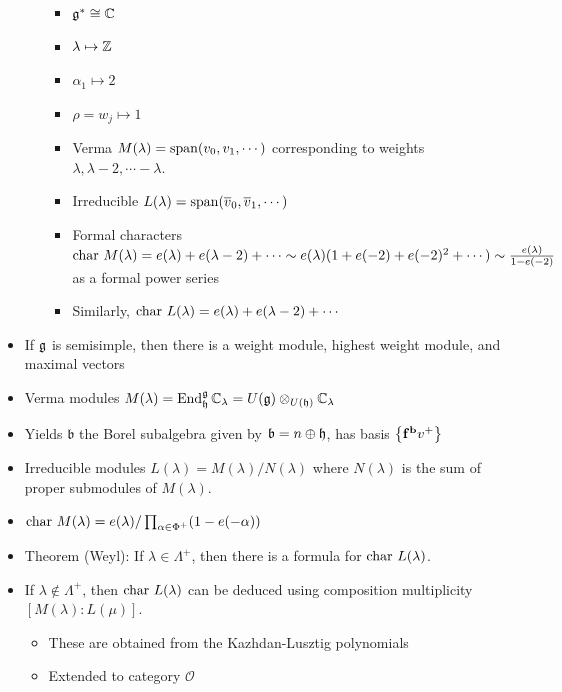 \begin{itemize}
\begin{itemize}
    \begin{itemize}
    \tightlist
    \item
      \({\mathfrak{g}}^* \cong {\mathbb{C}}\)
    \item
      \(\lambda \mapsto {\mathbb{Z}}\)
    \item
      \(\alpha_1 \mapsto 2\)
    \item
      \(\rho = w_j \mapsto 1\)
    \item
      Verma \(M(\lambda) = {\mathrm{span}}(v_0, v_1, \cdots)\) corresponding to
      weights \(\lambda, \lambda-2, \cdots -\lambda\).
    \item
      Irreducible
      \(L(\lambda) = {\mathrm{span}}(\overline v_0, \overline v_1, \cdots)\)
    \item
      Formal characters
      \(\mathrm{char}~ M(\lambda) = e(\lambda) + e(\lambda - 2) + \cdots \sim e(\lambda)(1 + e(-2) + e(-2)^2 + \cdots) \sim \frac{e(\lambda)}{1 - e(-2)}\)
      as a formal power series
    \item
      Similarly,
      \(\mathrm{char}~ L(\lambda) = e(\lambda) + e(\lambda - 2) + \cdots\)
    \end{itemize}
  \end{itemize}
\item
  If \({\mathfrak{g}}\) is semisimple, then there is a weight module, highest
  weight module, and maximal vectors
\item
  Verma modules
  \(M(\lambda) = \operatorname{End}_{\mathfrak{h}}^{\mathfrak{g}} {\mathbb{C}}_\lambda = U({\mathfrak{g}}) \otimes_{U( {\mathfrak{h}} )} {\mathbb{C}}_\lambda\)
\item
  Yields \(\mathfrak{b}\) the Borel subalgebra given by
  \(\mathfrak{b} = n \oplus {\mathfrak{h}}\), has basis
  \(\left\{{\mathbf{f}^{\mathbf{b}} v^+}\right\}\)
\item
  Irreducible modules \(L(\lambda) = M(\lambda)/ N(\lambda)\) where
  \(N(\lambda)\) is the sum of proper submodules of \(M(\lambda)\).
\item
  \(\mathrm{char}~ M(\lambda) = e(\lambda) / \prod_{\alpha \in \Phi^+} (1 - e(-\alpha))\)
\item
  Theorem (Weyl): If \(\lambda \in \Lambda^+\), then there is a formula
  for \(\mathrm{char}~ L(\lambda)\).
\item
  If \(\lambda \not\in \Lambda^+\), then \(\mathrm{char}~ L(\lambda)\) can be
  deduced using composition multiplicity \([M(\lambda) : L(\mu)]\).

  \begin{itemize}
  \tightlist
  \item
    These are obtained from the Kazhdan-Lusztig polynomials
  \item
    Extended to category \(\mathcal{O}\)
  \end{itemize}
\end{itemize}

